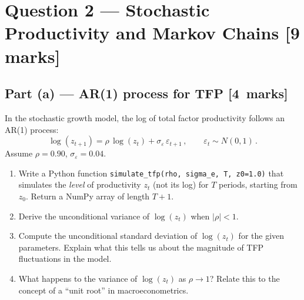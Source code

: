 \documentclass[11pt,a4paper]{article}
\newcommand{\mkpts}[1]{\hfill\textbf{[#1~marks]}}
\begin{document}
\section*{Question 2 --- Stochastic Productivity and Markov Chains \hfill [9 marks]}

\subsection*{Part (a) --- AR(1) process for TFP \mkpts{4}}

In the stochastic growth model, the log of total factor productivity follows an AR(1) process:
\[
\log(z_{t+1}) = \rho\,\log(z_t) + \sigma_\varepsilon\,\varepsilon_{t+1}\,, \qquad \varepsilon_t \sim N(0,1)\,.
\]
Assume $\rho = 0.90$, $\sigma_\varepsilon = 0.04$.

\begin{enumerate}[label=(\roman*),nosep]
\item Write a Python function \texttt{simulate\_tfp(rho, sigma\_e, T, z0=1.0)} that simulates the \emph{level} of productivity $z_t$ (not its log) for $T$ periods, starting from $z_0$.  Return a NumPy array of length $T{+}1$.
\item Derive the unconditional variance of $\log(z_t)$ when $|\rho|<1$.
\item Compute the unconditional standard deviation of $\log(z_t)$ for the given parameters.  Explain what this tells us about the magnitude of TFP fluctuations in the model.
\item What happens to the variance of $\log(z_t)$ as $\rho \to 1$?  Relate this to the concept of a ``unit root'' in macroeconometrics.
\end{enumerate}
\end{document}
